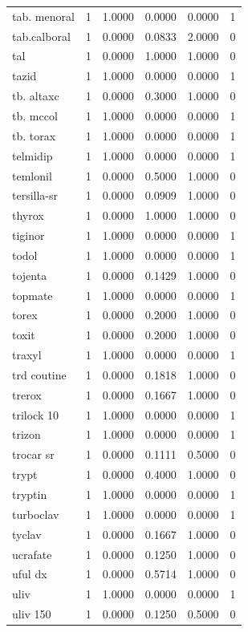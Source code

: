 \begin{longtable}{p{3.0cm}rrrrr}
tab. menoral & 1 & 1.0000 & 0.0000 & 0.0000 & 1 \\
tab.calboral & 1 & 0.0000 & 0.0833 & 2.0000 & 0 \\
tal & 1 & 0.0000 & 1.0000 & 1.0000 & 0 \\
tazid & 1 & 1.0000 & 0.0000 & 0.0000 & 1 \\
tb. altaxc & 1 & 0.0000 & 0.3000 & 1.0000 & 0 \\
tb. mccol & 1 & 1.0000 & 0.0000 & 0.0000 & 1 \\
tb. torax & 1 & 1.0000 & 0.0000 & 0.0000 & 1 \\
telmidip & 1 & 1.0000 & 0.0000 & 0.0000 & 1 \\
temlonil & 1 & 0.0000 & 0.5000 & 1.0000 & 0 \\
tersilla-sr & 1 & 0.0000 & 0.0909 & 1.0000 & 0 \\
thyrox & 1 & 0.0000 & 1.0000 & 1.0000 & 0 \\
tiginor & 1 & 1.0000 & 0.0000 & 0.0000 & 1 \\
todol & 1 & 1.0000 & 0.0000 & 0.0000 & 1 \\
tojenta & 1 & 0.0000 & 0.1429 & 1.0000 & 0 \\
topmate & 1 & 1.0000 & 0.0000 & 0.0000 & 1 \\
torex & 1 & 0.0000 & 0.2000 & 1.0000 & 0 \\
toxit & 1 & 0.0000 & 0.2000 & 1.0000 & 0 \\
traxyl & 1 & 1.0000 & 0.0000 & 0.0000 & 1 \\
trd coutine & 1 & 0.0000 & 0.1818 & 1.0000 & 0 \\
trerox & 1 & 0.0000 & 0.1667 & 1.0000 & 0 \\
trilock 10 & 1 & 1.0000 & 0.0000 & 0.0000 & 1 \\
trizon & 1 & 1.0000 & 0.0000 & 0.0000 & 1 \\
trocar sr & 1 & 0.0000 & 0.1111 & 0.5000 & 0 \\
trypt & 1 & 0.0000 & 0.4000 & 1.0000 & 0 \\
tryptin & 1 & 1.0000 & 0.0000 & 0.0000 & 1 \\
turboclav & 1 & 1.0000 & 0.0000 & 0.0000 & 1 \\
tyclav & 1 & 0.0000 & 0.1667 & 1.0000 & 0 \\
ucrafate & 1 & 0.0000 & 0.1250 & 1.0000 & 0 \\
uful dx & 1 & 0.0000 & 0.5714 & 1.0000 & 0 \\
uliv & 1 & 1.0000 & 0.0000 & 0.0000 & 1 \\
uliv 150 & 1 & 0.0000 & 0.1250 & 0.5000 & 0 \\

\end{longtable}
